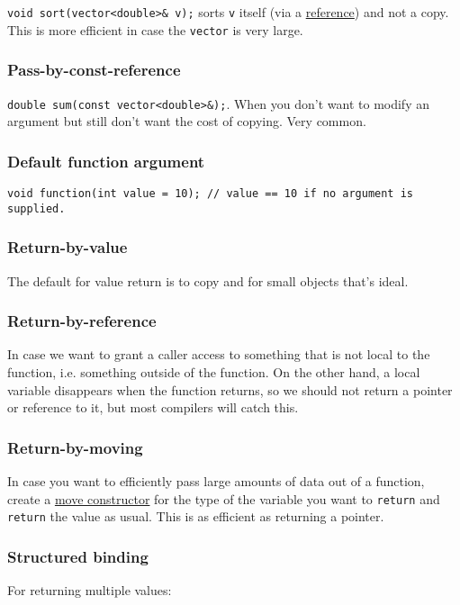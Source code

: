 \documentclass[8pt, table, xcdraw]{article}%
\begin{document}
\lstinline|void sort(vector<double>& v);| sorts \lstinline{v} itself (via a \hyperref[reference]{reference}) and not a copy. This is more efficient in case the \lstinline{vector} is very large.

\subsubsection{Pass-by-const-reference}

\lstinline|double sum(const vector<double>&);|. When you don't want to modify an argument but still don't want the cost of copying. Very common.

\subsubsection{Default function argument}
\lstinline{void function(int value = 10); // value == 10 if no argument is supplied.}

\subsubsection{Return-by-value}
The default for value return is to copy and for small objects that’s ideal.

\subsubsection{Return-by-reference}
In case we want to grant a caller access to something that is not local to the function, i.e. something outside of the function. On the other hand, a local variable disappears when the function returns, so we should not return a pointer or reference to it, but most compilers will catch this.

\subsubsection{Return-by-moving}
In case you want to efficiently pass large amounts of data out of a function, create a \hyperref[moveconstructor]{move constructor} for the type of the variable you want to \lstinline{return} and \lstinline{return} the value as usual. This is as efficient as returning a pointer.

\subsubsection{Structured binding}
For returning multiple values:
\end{document}
